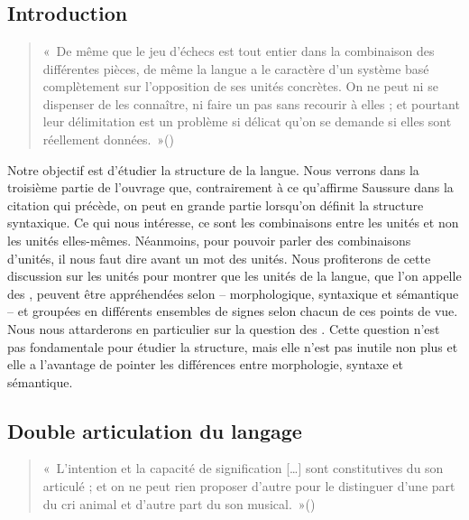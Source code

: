\chapter{}\label{sec:2.1}

\section{Introduction}\label{sec:2.1.0}

\begin{quote}
    «~De même que le jeu d’échecs est tout entier dans la combinaison des différentes pièces, de même la langue a le caractère d’un système basé complètement sur l’opposition de ses unités concrètes. On ne peut ni se dispenser de les connaître, ni faire un pas sans recourir à elles ; et pourtant leur délimitation est un problème si délicat qu’on se demande si elles sont réellement données.~»\hfill\hbox{(\citealt[149]{saussure1916cours})}
\end{quote}

Notre objectif est d’étudier la structure de la langue. Nous verrons dans la troisième partie de l'ouvrage que, contrairement à ce qu’affirme Saussure dans la citation qui précède, on peut en grande partie   lorsqu’on définit la structure syntaxique. Ce qui nous intéresse, ce sont les combinaisons entre les unités et non les unités elles-mêmes. Néanmoins, pour pouvoir parler des combinaisons d’unités, il nous faut dire avant un mot des unités. Nous profiterons de cette discussion sur les unités pour montrer que les unités de la langue, que l’on appelle des , peuvent être appréhendées selon  – morphologique, syntaxique et sémantique – et groupées en différents ensembles de signes selon chacun de ces points de vue. Nous nous attarderons en particulier sur la question des . Cette question n’est pas fondamentale pour étudier la structure, mais elle n’est pas inutile non plus et elle a l’avantage de pointer les différences entre morphologie, syntaxe et sémantique.

\section{Double articulation du langage}\label{sec:2.1.1}

\begin{quote}
    «~L’intention et la capacité de signification […] sont constitutives du son articulé ; et on ne peut rien proposer d’autre pour le distinguer d’une part du cri animal et d’autre part du son musical.~»\hfill\hbox{(\citealt[60]{humboldt1836uber})}
\end{quote}

